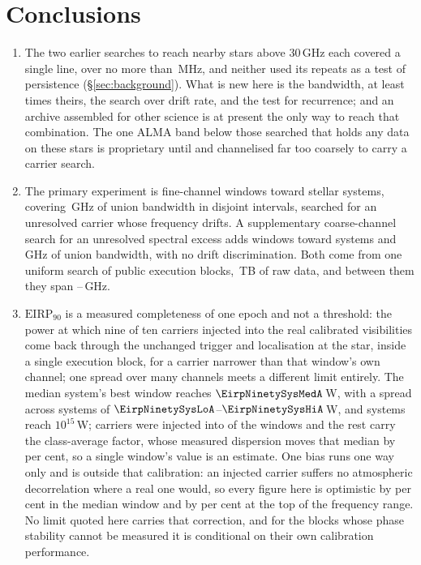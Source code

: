 \section{Conclusions}
\label{sec:conclusions}

\begin{enumerate}[leftmargin=1.6em,itemsep=4pt,topsep=4pt,parsep=0pt]

\item The two earlier searches to reach nearby stars above 30\,GHz each
covered a single line, over no more than \SbPriorBandMHz\,MHz, and neither
used its repeats as a test of persistence (\S\ref{sec:background}). What is
new here is the bandwidth, at least \SbPriorRatio{} times theirs, the search
over drift rate, and the test for recurrence; and an
archive assembled for other science is at present the only way to reach that
combination. The one
ALMA band below those searched that holds any data on these stars is
proprietary until \SbBoneRelYear{} and channelised far too coarsely to carry
a carrier search.

\item The primary experiment is \NWinA{} fine-channel windows toward
\NSysClassA{} stellar systems, covering \CvUnionA\,GHz of union bandwidth in
\CovNIslands{} disjoint intervals, searched for an unresolved carrier whose
frequency drifts. A supplementary coarse-channel search for an unresolved spectral
excess adds \NWinB{} windows toward \PrSysClassB{} systems and
\CvUnionB\,GHz of union bandwidth, with no drift discrimination. Both come
from one uniform search of \NEB{} public execution blocks,
\TotalDataTB\,TB of raw data, and between them they span
\SurvFreqLo--\SurvFreqHi\,GHz.

\item $\mathrm{EIRP}_{90}$ is a measured completeness of one epoch and not a
threshold: the power at which nine of ten carriers
injected into the real calibrated visibilities come back through the
unchanged trigger and localisation at the star, inside a single execution
block, for a carrier narrower than that window's own channel; one spread over
many channels meets a different limit entirely. The median
system's best window reaches $\EirpNinetySysMedA$\,W, with a spread across
systems of $\EirpNinetySysLoA$--$\EirpNinetySysHiA$\,W, and
\NSysEfifteen{} systems reach $10^{15}$\,W; carriers were injected into
\SensNInj{} of the \NWinA{} windows and the rest carry the class-average
factor, whose measured dispersion moves that median by \ScRsMedShiftPct{} per
cent, so a single window's value is an estimate. One bias runs one way only
and is outside that calibration: an injected carrier suffers no atmospheric
decorrelation where a real one would, so every figure here is optimistic by
\SensDecorPct{} per cent in the median window and by \SensDecorHiPct{} per
cent at the top of the frequency range. No limit quoted here
carries that correction, and for the \RpDecNUn{} blocks whose phase stability
cannot be measured it is conditional on their own calibration performance.


\end{enumerate}

